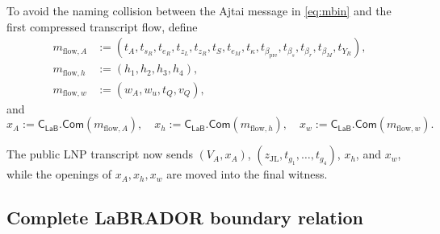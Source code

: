 \documentclass[11pt,a4paper]{article}
\newcommand{\Com}{\mathsf{Com}}
\newcommand{\CLaB}{\mathsf{C}_{\mathsf{LaB}}}
\begin{document}
To avoid the naming collision between the Ajtai message in
\cref{eq:mbin} and the first compressed transcript flow, define
\begin{align*}
 m_{\mathrm{flow},A}&:=(t_A,t_{s_R},t_{e_R},t_{z_L},t_{z_R},t_S,t_{e_M},
  t_\kappa,t_{\beta_{\mathrm{pre}}},t_{\beta_s},t_{\beta_r},t_{\beta_M},t_{Y_R}),\\
 m_{\mathrm{flow},h}&:=(h_1,h_2,h_3,h_4),\\
 m_{\mathrm{flow},w}&:=(w_A,w_u,t_Q,v_Q),
\end{align*}
and
\begin{equation}
  x_A:=\CLaB.\Com(m_{\mathrm{flow},A}),\quad
  x_h:=\CLaB.\Com(m_{\mathrm{flow},h}),\quad
  x_w:=\CLaB.\Com(m_{\mathrm{flow},w}).
  \label{eq:three-flow-commitments}
\end{equation}

The public LNP transcript now sends \((V_A,x_A)\),
\((z_{\mathrm{JL}},t_{g_1},\ldots,t_{g_4})\), \(x_h\), and \(x_w\), while
the openings of \(x_A,x_h,x_w\) are moved into the final witness.

\subsection{Complete LaBRADOR boundary relation}
\end{document}
